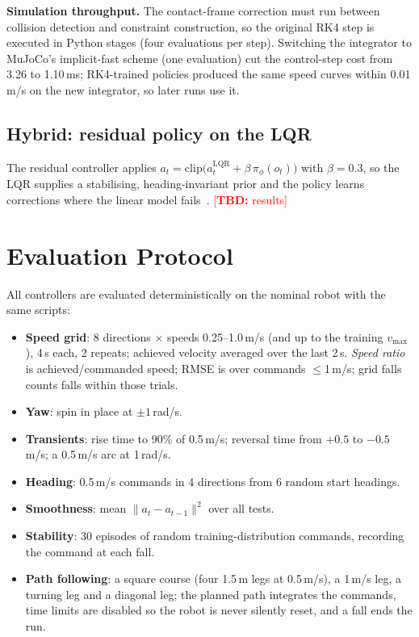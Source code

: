 \documentclass[conference]{IEEEtran}
\theoremstyle{remark}
\newcommand{\tbd}[1]{\textcolor{red}{[\textbf{TBD:} #1]}}
\begin{document}
\textbf{Simulation throughput.} The contact-frame correction must run between collision detection and constraint construction, so the original RK4 step is executed in Python stages (four evaluations per step). Switching the integrator to MuJoCo's implicit-fast scheme (one evaluation) cut the control-step cost from 3.26 to 1.10\,ms; RK4-trained policies produced the same speed curves within 0.01\,m/s on the new integrator, so later runs use it.

\subsection{Hybrid: residual policy on the LQR}
The residual controller applies $a_t=\mathrm{clip}\big(a^{\mathrm{LQR}}_t+\beta\,\pi_\phi(o_t)\big)$ with $\beta=0.3$, so the LQR supplies a stabilising, heading-invariant prior and the policy learns corrections where the linear model fails~\cite{johannink2019,silver2018}. \tbd{results}

\section{Evaluation Protocol}\label{sec:eval}
All controllers are evaluated deterministically on the nominal robot with the same scripts:
\begin{itemize}
\item \textbf{Speed grid}: 8 directions $\times$ speeds 0.25--1.0\,m/s (and up to the training $v_{\max}$), 4\,s each, 2 repeats; achieved velocity averaged over the last 2\,s. \emph{Speed ratio} is achieved/commanded speed; RMSE is over commands $\le$1\,m/s; grid falls counts falls within those trials.
\item \textbf{Yaw}: spin in place at $\pm1$\,rad/s.
\item \textbf{Transients}: rise time to 90\% of 0.5\,m/s; reversal time from $+0.5$ to $-0.5$\,m/s; a 0.5\,m/s arc at 1\,rad/s.
\item \textbf{Heading}: 0.5\,m/s commands in 4 directions from 6 random start headings.
\item \textbf{Smoothness}: mean $\lVert a_t-a_{t-1}\rVert^2$ over all tests.
\item \textbf{Stability}: 30 episodes of random training-distribution commands, recording the command at each fall.
\item \textbf{Path following}: a square course (four 1.5\,m legs at 0.5\,m/s), a 1\,m/s leg, a turning leg and a diagonal leg; the planned path integrates the commands, time limits are disabled so the robot is never silently reset, and a fall ends the run.
\end{itemize}
\end{document}
